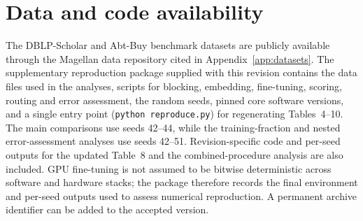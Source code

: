 \documentclass[11pt]{article}
\newcommand{\rev}[1]{{\color{revisionblue}#1}}
\begin{document}

\tableofcontents
\clearpage

%




%














\section*{Data and code availability}
\rev{The DBLP-Scholar and Abt-Buy benchmark datasets are publicly available through the Magellan data repository cited in Appendix~\ref{app:datasets}. The supplementary reproduction package supplied with this revision contains the data files used in the analyses, scripts for blocking, embedding, fine-tuning, scoring, routing and error assessment, the random seeds, pinned core software versions, and a single entry point (\texttt{python reproduce.py}) for regenerating Tables~4--10. The main comparisons use seeds 42--44, while the training-fraction and nested error-assessment analyses use seeds 42--51. Revision-specific code and per-seed outputs for the updated Table~8 and the combined-procedure analysis are also included. GPU fine-tuning is not assumed to be bitwise deterministic across software and hardware stacks; the package therefore records the final environment and per-seed outputs used to assess numerical reproduction. A permanent archive identifier can be added to the accepted version.}
\end{document}
